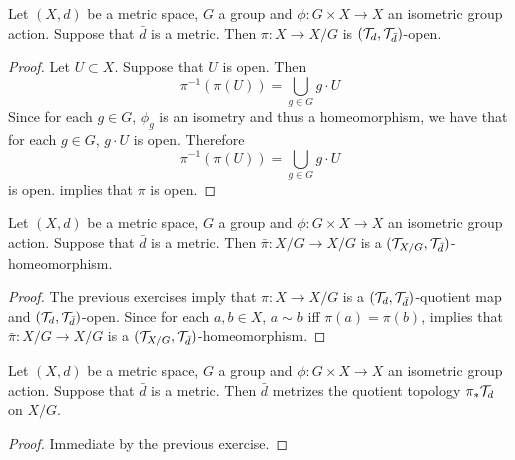 \documentclass{book}
\begin{document}
	\begin{ex}
	Let $(X,d)$ be a metric space, $G$ a group and $\phi: G \times X \rightarrow X$ an isometric group action. Suppose that $\bar{d}$ is a metric. Then $\pi: X \rightarrow X/G$ is $(\mathcal{T}_{d}, \mathcal{T}_{\bar{d}})$-open.
	\end{ex}
	
	\begin{proof}
	Let $U \subset X$. Suppose that $U$ is open. Then 
	\begin{equation*}
	\pi^{-1}(\pi(U)) = \bigcup_{g \in G} g \cdot U
	\end{equation*}		
	Since for each $g \in G$, $\phi_g$ is an isometry and thus a homeomorphism, we have that for each $g \in G$, $g \cdot U$ is open. Therefore 
	$$\pi^{-1}(\pi(U)) = \bigcup\limits_{g \in G} g \cdot U$$
	is open.  implies that $\pi$ is open.
	\end{proof}

	\begin{ex}
		Let $(X,d)$ be a metric space, $G$ a group and $\phi: G \times X \rightarrow X$ an isometric group action. Suppose that $\bar{d}$ is a metric. Then $\bar{\pi}:{X/G} \rightarrow {X/G}$ is a $(\mathcal{T}_{X/G}, \mathcal{T}_{\bar{d}})$-homeomorphism.
	\end{ex}

	\begin{proof}
		The previous exercises imply that $\pi: X \rightarrow X/G$ is a $(\mathcal{T}_d, \mathcal{T}_{\bar{d}})$-quotient map and $(\mathcal{T}_d, \mathcal{T}_{\bar{d}})$-open. Since for each $a,b \in X$, $a \sim b$ iff $\pi(a) = \pi(b)$,  implies that $\bar{\pi}:{X/G} \rightarrow {X/G}$ is a $(\mathcal{T}_{X/G}, \mathcal{T}_{\bar{d}})$-homeomorphism.
	\end{proof}
	
	\begin{ex}
	Let $(X,d)$ be a metric space, $G$ a group and $\phi: G \times X \rightarrow X$ an isometric group action. Suppose that $\bar{d}$ is a metric. Then $\bar{d}$ metrizes the quotient topology $\pi_*\mathcal{T}_d$ on $X/G$.
	\end{ex}
	
	\begin{proof}
	Immediate by the previous exercise.
	\end{proof}
	
	
	
	
	
	
	
	
	
	
	
	
	
\end{document}
